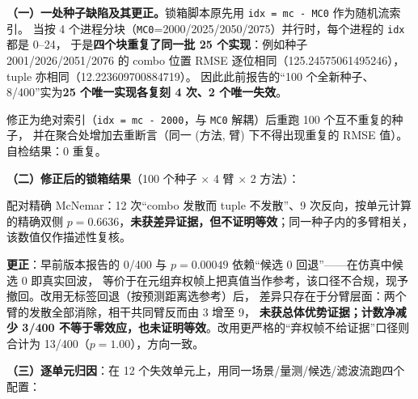 \documentclass[UTF8,a4paper,zihao=-4]{ctexart}
\begin{document}
\textbf{（一）一处种子缺陷及其更正。}锁箱脚本原先用 \texttt{idx = mc - MC0} 作为随机流索引。
当按 4 个进程分块（\texttt{MC0}=2000/2025/2050/2075）并行时，每个进程的 \texttt{idx} 都是 0--24，
于是\textbf{四个块重复了同一批 25 个实现}：例如种子 2001/2026/2051/2076 的 combo 位置 RMSE
逐位相同（125.24575061495246），tuple 亦相同（12.223609700884719）。
因此此前报告的“100 个全新种子、8/400”实为\textbf{25 个唯一实现各复刻 4 次、2 个唯一失效}。

修正为绝对索引（\texttt{idx = mc - 2000}，与 \texttt{MC0} 解耦）后重跑 100 个互不重复的种子，
并在聚合处增加去重断言（同一 (方法, 臂) 下不得出现重复的 RMSE 值）。自检结果：0 重复。

\textbf{（二）修正后的锁箱结果}（100 个种子 $\times$ 4 臂 $\times$ 2 方法）：

\begin{table}[htbp]\centering\small
\caption{锁箱重跑（100 个互不重复的种子；无标签回退；位置 RMSE，m）}\label{tab:lockbox-v3}
\end{table}

配对精确 McNemar：12 次“combo 发散而 tuple 不发散”、9 次反向，按单元计算的精确双侧 $p=0.6636$，\textbf{未获差异证据，但不证明等效}；同一种子内的多臂相关，该数值仅作描述性复核。

\textbf{更正}：早前版本报告的 0/400 与 $p=0.00049$ 依赖“候选 0 回退”——在仿真中候选 0 即真实回波，
等价于在元组弃权帧上把真值当作参考，该口径不合规，现予撤回。改用无标签回退（按预测距离选参考）后，
差异只存在于分臂层面：两个臂的发散全部消除，相干共同臂反而由 3 增至 9，
\textbf{未获总体优势证据；计数净减少 3/400 不等于零效应，也未证明等效}。改用更严格的“弃权帧不给证据”口径则合计为 13/400（$p=1.00$），方向一致。

\textbf{（三）逐单元归因}：在 12 个失效单元上，用同一场景/量测/候选/滤波流跑四个配置：
\end{document}
